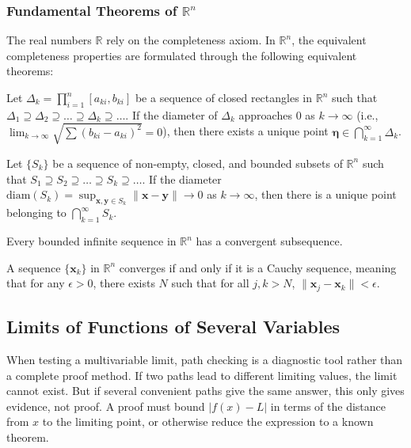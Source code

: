 \subsubsection{Fundamental Theorems of \texorpdfstring{$\mathbb{R}^n$}{R n}}

The real numbers $\mathbb{R}$ rely on the completeness axiom. In $\mathbb{R}^n$, the equivalent completeness properties are formulated through the following equivalent theorems:

\begin{theorem}
Let $\Delta_k = \prod_{i=1}^n [a_{ki}, b_{ki}]$ be a sequence of closed rectangles in $\mathbb{R}^n$ such that $\Delta_1 \supseteq \Delta_2 \supseteq \dots \supseteq \Delta_k \supseteq \dots$. If the diameter of $\Delta_k$ approaches $0$ as $k \to \infty$ (i.e., $\lim_{k \to \infty} \sqrt{\sum (b_{ki} - a_{ki})^2} = 0$), then there exists a unique point $\mathbf{\eta} \in \bigcap_{k=1}^{\infty} \Delta_k$.
\end{theorem}

\begin{theorem}
Let $\{S_k\}$ be a sequence of non-empty, closed, and bounded subsets of $\mathbb{R}^n$ such that $S_1 \supseteq S_2 \supseteq \dots \supseteq S_k \supseteq \dots$. If the diameter $\text{diam}(S_k) = \sup_{\mathbf{x}, \mathbf{y} \in S_k} \|\mathbf{x} - \mathbf{y}\| \to 0$ as $k \to \infty$, then there is a unique point belonging to $\bigcap_{k=1}^{\infty} S_k$.
\end{theorem}

\begin{theorem}
Every bounded infinite sequence in $\mathbb{R}^n$ has a convergent subsequence.
\end{theorem}

\begin{theorem}
A sequence $\{\mathbf{x}_k\}$ in $\mathbb{R}^n$ converges if and only if it is a Cauchy sequence, meaning that for any $\epsilon > 0$, there exists $N$ such that for all $j, k > N$, $\|\mathbf{x}_j - \mathbf{x}_k\| < \epsilon$.
\end{theorem}

\subsection{Limits of Functions of Several Variables}


When testing a multivariable limit, path checking is a diagnostic tool rather than a complete proof method. If two paths lead to different limiting values, the limit cannot exist. But if several convenient paths give the same answer, this only gives evidence, not proof. A proof must bound $|f(x)-L|$ in terms of the distance from $x$ to the limiting point, or otherwise reduce the expression to a known theorem.

